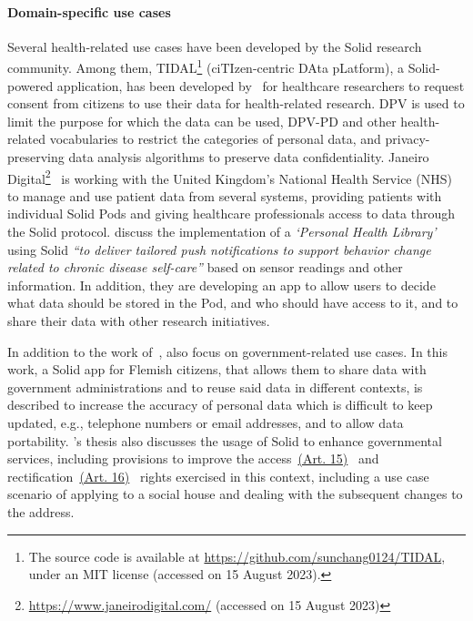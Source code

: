 \paragraph{Domain-specific use cases}
Several health-related use cases have been developed by the Solid research community.
Among them, TIDAL\footnote{The source code is available at \url{https://github.com/sunchang0124/TIDAL}, under an MIT license (accessed on 15 August 2023).} (ciTIzen-centric DAta pLatform), a Solid-powered application, has been developed by~\cite{sun_citizen-centric_2023} for healthcare researchers to request consent from citizens to use their data for health-related research. DPV is used to limit the purpose for which the data can be used, DPV-PD and other health-related vocabularies to restrict the categories of personal data, and privacy-preserving data analysis algorithms to preserve data confidentiality.
Janeiro Digital\footnote{\url{https://www.janeirodigital.com/} (accessed on 15 August 2023)}~\citeyearpar{noauthor_janeiro_nodate} is working with the United Kingdom's National Health Service (NHS) to manage and use patient data from several systems, providing patients with individual Solid Pods and giving healthcare professionals access to data through the Solid protocol.
\cite{ammar_personal_2020,ammar_using_2021} discuss the implementation of a \textit{`Personal Health Library'} using Solid \textit{``to deliver tailored push notifications to support behavior change related to chronic disease self-care''} based on sensor readings and other information.
In addition, they are developing an app to allow users to decide what data should be stored in the Pod, and who should have access to it, and to share their data with other research initiatives.

In addition to the work of~\cite{de_bot_data_2021}, \cite{chugunov_streamlining_2020} also focus on government-related use cases. In this work, a Solid app for Flemish citizens, that allows them to share data with government administrations and to reuse said data in different contexts, is described to increase the accuracy of personal data which is difficult to keep updated, e.g., telephone numbers or email addresses, and to allow data portability.
\citeauthor{wang_enhancing_2020}'s thesis also discusses the usage of Solid to enhance governmental services, including provisions to improve the access~\hyperref[art:15]{(Art. 15)}~\citeyearpar{noauthor_regulation_2016} and rectification~\hyperref[art:16]{(Art. 16)}~\citeyearpar{noauthor_regulation_2016} rights exercised in this context, including a use case scenario of applying to a social house and dealing with the subsequent changes to the address. 

